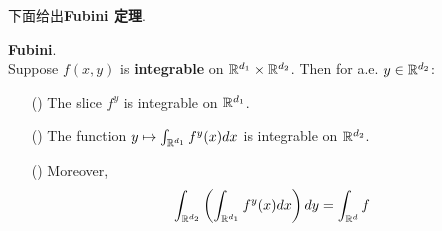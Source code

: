 	\vspace{4em}
	下面给出\textbf{Fubini 定理}.
	\begin{thm}\label{thm 3.5.1}
		\textbf{Fubini}. \\
		Suppose $f(x , y)$ is \textbf{integrable} on $\mathbb{R}^{d_1} \times \mathbb{R}^{d_2}$. Then for a.e. $y \in \mathbb{R}^{d_2}$:
		\begin{enumerate}
			\item[(\rmnum{1})]The slice $f^y$ is integrable on $\mathbb{R}^{d_1}$.
			
			\item[(\rmnum{2})]The function $y \mapsto \int_{\mathbb{R}^{d_1}}{f^{y}(x) dx}$ is integrable on $\mathbb{R}^{d_2}$.
			
			\item[(\rmnum{3})]Moreover,
			\begin{align}
				\int_{\mathbb{R}^{d_2}}{\left( \int_{\mathbb{R}^{d_1}}{f^{y}(x) dx} \right) dy} = \int_{\mathbb{R}^d}{f}
			\end{align}
		\end{enumerate}
	\end{thm}

\newpage
